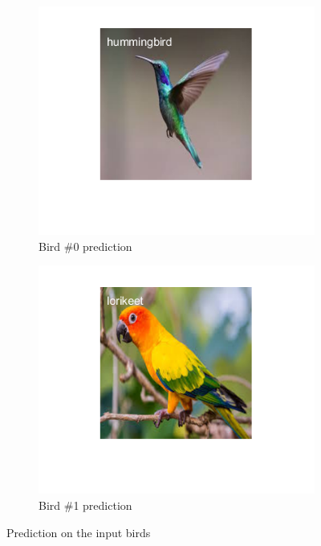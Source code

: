 \documentclass[a4paper]{iacas}
\begin{document}
\vskip 0.1in
\begin{figure}
  \begin{subfigure}{0.4\linewidth}
	\includegraphics[width=\linewidth]{imgs/bird_0_labeled.png}
	\caption{Bird \#0 prediction}
  \end{subfigure}
  \begin{subfigure}{0.4\linewidth}
	\includegraphics[width=\linewidth]{imgs/bird_1_labeled.png}
	\caption{Bird \#1 prediction}
  \end{subfigure}
\caption{Prediction on the input birds}
\end{figure}
\vskip 0.1in
\end{document}
